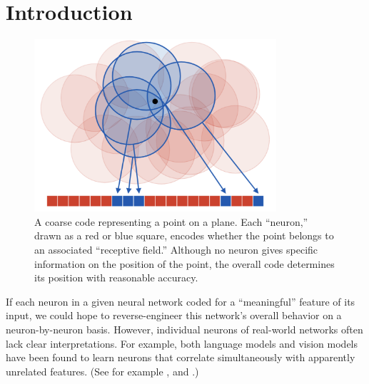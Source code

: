\section{Introduction}

\begin{figure}[b]
	\begin{minipage}[c]{0.5\textwidth}
		\begin{center}
		\centerline{\includegraphics[width=0.8\textwidth]{../figures/coarse_code_short.png}}
				\end{center}
	\end{minipage}%
	\begin{minipage}[c]{0.5\textwidth}
		\vspace{-20pt}
		\caption{A coarse code representing a point on a plane. Each ``neuron,'' drawn as a red or blue square, encodes whether the point belongs to an associated ``receptive field.'' Although no neuron gives specific information on the position of the point, the overall code determines its position with reasonable accuracy.}
		\label{coarse-code}
	\end{minipage}
\end{figure}

If each neuron in a given neural network coded for a ``meaningful'' feature of its input, we could hope to reverse-engineer this network's overall behavior on a neuron-by-neuron basis. However, individual neurons of real-world networks often lack clear interpretations. For example, both language models and vision models have been found to learn neurons that correlate simultaneously with apparently unrelated features. (See for example \citet{nguyen_multifaceted_2016}, \citet{zhang_sample_2023} and \citet{olah_zoom_2020}.)

